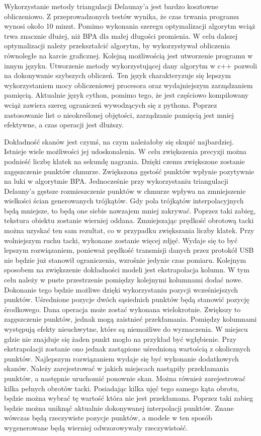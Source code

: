 Wykorzystanie metody triangulacji Delaunay'a jest bardzo kosztowne obliczeniowo. Z przeprowadzonych testów wynika, że czas trwania programu wynosi około 10 minut. Pomimo wykonania szeregu optymalizacji algorytm wciąż trwa znacznie dłużej, niż BPA dla małej długości promienia. W celu dalszej optymalizacji należy przekształcić algorytm, by wykorzystywał obliczenia równoległe na karcie graficznej. Kolejną możliwością jest utworzenie programu w innym języku. Utworzenie metody wykorzystującej dany algorytm w c++ pozwoli na dokonywanie szybszych obliczeń. Ten język charakteryzuje się lepszym wykorzystaniem mocy obliczeniowej procesora oraz wydajniejszym zarządzaniem pamięcią. Aktualnie język cython, pomimo tego, że jest częściowo kompilowany wciąż zawiera szereg ograniczeń wywodzących się z pythona. Poprzez zastosowanie list o nieokreślonej objętości, zarządzanie pamięcią jest mniej efektywne, a czas operacji jest dłuższy. 

Dokładność skanów jest czymś, na czym należałoby się skupić najbardziej. Istnieje wiele możliwości jej udoskonalenia. W celu zwiększenia precyzji można podnieść liczbę klatek na sekundę nagrania. Dzięki czemu zwiększone zostanie zagęszczenie punktów chmurze. Zwiększona gęstość punktów wpłynie pozytywnie na luki w algorytmie BPA. Jednocześnie przy wykorzystaniu triangulacji Delauny'a gęstsze rozmieszczenie punktów w chmurze wpływa na zmniejszenie wielkości ścian generowanych trójkątów. Gdy pola trójkątów interpolacyjnych będą mniejsze, to będą one siebie nawzajem mniej zakrywać. Poprzez taki zabieg, tekstura obiektu zostanie wierniej oddana. Zmniejszając prędkość obrotową tacki można uzyskać ten sam rezultat, co w przypadku zwiększania liczby klatek. Przy wolniejszym ruchu tacki, wykonane zostanie więcej zdjęć. Wydaje się to być lepszym rozwiązaniem, ponieważ prędkość transmisji danych przez protokół USB nie będzie już stanowił ograniczenia, wzrośnie jedynie czas pomiaru. Kolejnym sposobem na zwiększenie dokładności modeli jest ekstrapolacja kolumn. W tym celu należy w puste przestrzenie pomiędzy kolejnymi kolumnami dodać nowe. Dokonanie tego będzie możliwe dzięki wykorzystaniu pozycji wcześniejszych punktów. Uśrednione pozycje dwóch sąsiednich punktów będą stanowić pozycję środkowego. Dana operacja może zostać wykonana wielokrotnie. Zwiększy to zagęszczenie punktów, jednak mogą zaistnieć przekłamania. Pomiędzy kolumnami występują efekty nieuchwytne, które są niemożliwe do wyznaczenia. W miejscu gdzie nie znajduje się żaden punkt mogło na przykład być wgłębienie. Przy ekstrapolacji zostanie ono jednak zastąpione uśrednioną wartością z okolicznych punktów. Najlepszym rozwiązaniem wydaje się być wykonanie dodatkowych skanów. Należy zarejestrować w jakich miejscach nastąpiły przekłamania punktów, a następnie uruchomić ponownie skan. Można również zarejestrować kilka pełnych obrotów tacki. Posiadając kilka ujęć tego samego kąta obrotu, będzie można wybrać tę wartość która nie jest przekłamana. Poprzez taki zabieg będzie można uniknąć aktualnie dokonywanej interpolacji punktów. Znane wówczas będą rzeczywiste pozycje punktów, a modele w ten sposób wygenerowane będą wierniej odwzorowywały rzeczywistość. 

